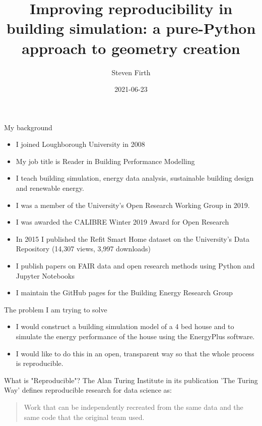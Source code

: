 \documentclass{beamer}
\title[Improving reproducibility in building simulation]{Improving reproducibility in building simulation: a pure-Python approach to geometry creation}
\author{Steven Firth}
\institute{Loughborough University}
\date{2021-06-23}
\begin{document}
	
	\begin{frame}
		\maketitle
	\end{frame}
	
	\begin{frame}{My background}
		\begin{itemize}
			\item I joined Loughborough University in 2008
			\item My job title is Reader in Building Performance Modelling
			\item I teach building simulation, energy data analysis, sustainable building design and renewable energy.
			\item I was a member of the University's Open Research Working Group in 2019.
			\item I was awarded the CALIBRE Winter 2019 Award for Open Research
			\item In 2015 I published the Refit Smart Home dataset on the University's Data Repository (14,307 views, 3,997 downloads)
			\item I publish papers on FAIR data and open research methods using Python and Jupyter Notebooks 
			\item I maintain the GitHub pages for the Building Energy Research Group
			
		\end{itemize}
	\end{frame}
	
	\begin{frame}{The problem I am trying to solve}
		\begin{itemize}
			\item I would construct a building simulation model of a 4 bed house and to simulate the energy performance of the house using the EnergyPlus software.
			\item I would like to do this in an open, transparent way so that the whole process is reproducible. 
		\end{itemize}
	\end{frame}

	\begin{frame}{What is "Reproducible"?}
		The Alan Turing Institute in its publication 'The Turing Way' defines reproducible research for data science as: \\ [10pt]
		\begin{quote}
			Work that can be independently recreated from the same data and the same code that the original team used. 
		\end{quote}
	\end{frame}
\end{document}
